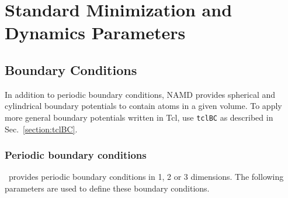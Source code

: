 \section{Standard Minimization and Dynamics Parameters}
\label{section:dynamics}


\subsection{Boundary Conditions}

In addition to periodic boundary conditions, NAMD provides spherical and
cylindrical boundary potentials to contain atoms in a given volume.
To apply more general boundary potentials written in Tcl, use
{\tt tclBC} as described in Sec.~\ref{section:tclBC}.

\subsubsection{Periodic boundary conditions}

\NAMD\ provides periodic boundary conditions in 1, 2 or 3 dimensions.
The following parameters are used to define these boundary conditions.  

